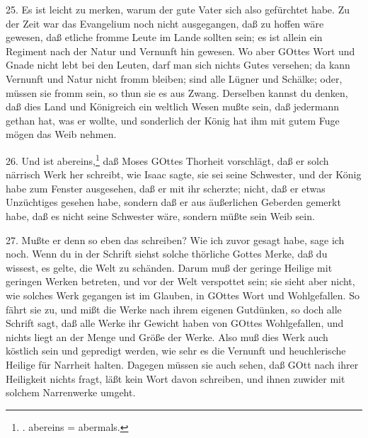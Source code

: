 25. Es ist leicht zu merken, warum der gute Vater sich also gefürchtet habe. Zu der Zeit war das Evangelium noch nicht ausgegangen, daß zu hoffen wäre gewesen, daß etliche fromme Leute im Lande sollten sein; es ist allein ein Regiment nach der Natur und Vernunft hin gewesen. Wo aber GOttes Wort und Gnade nicht lebt bei den Leuten, darf man sich nichts Gutes versehen; da kann Vernunft und Natur nicht fromm bleiben; sind alle Lügner und Schälke; oder, müssen sie fromm sein, so thun sie es aus Zwang. Derselben kannst du denken, daß dies Land und Königreich ein weltlich Wesen mußte sein, daß jedermann gethan hat, was er wollte, und sonderlich der König hat ihm mit gutem Fuge mögen das Weib nehmen.

26. Und ist abereins,\footnote{. abereins = abermals.} daß Moses GOttes Thorheit vorschlägt, daß er solch närrisch Werk her schreibt, wie Isaac sagte, sie sei seine Schwester, und der König habe zum Fenster ausgesehen, daß er mit ihr scherzte; nicht, daß er etwas Unzüchtiges gesehen habe, sondern daß er aus äußerlichen Geberden gemerkt habe, daß es nicht seine Schwester wäre, sondern müßte sein Weib sein.

27. Mußte er denn so eben das schreiben? Wie ich zuvor gesagt habe, sage ich noch. Wenn du in der Schrift siehst solche thörliche Gottes
Merke, daß du wissest, es gelte, die Welt zu schänden. Darum muß der geringe Heilige mit geringen Werken betreten, und vor der Welt verspottet sein; sie sieht aber nicht, wie solches Werk gegangen ist im Glauben, in GOttes Wort und Wohlgefallen. So fährt sie zu, und mißt die Werke nach ihrem eigenen Gutdünken, so doch alle Schrift sagt, daß alle Werke ihr Gewicht haben von GOttes Wohlgefallen, und nichts liegt an der Menge und Größe der Werke. Also muß dies Werk auch köstlich sein und gepredigt werden, wie sehr es die Vernunft und heuchlerische Heilige für Narrheit halten. Dagegen müssen sie auch sehen, daß GOtt nach ihrer Heiligkeit nichts fragt, läßt kein Wort davon schreiben, und ihnen zuwider mit solchem Narrenwerke umgeht.

